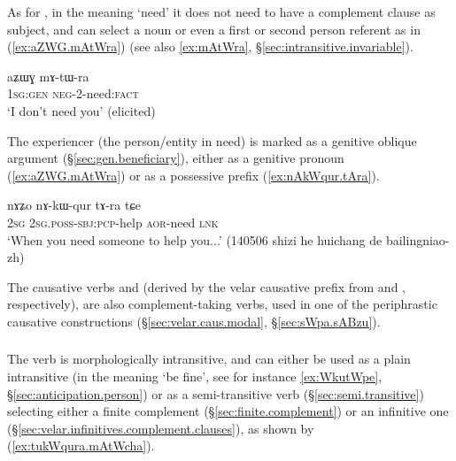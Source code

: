 As for , in the meaning `need' it does not need to have a complement clause as subject, and can select a noun or even a first or second person referent as in (\ref{ex:aZWG.mAtWra}) (see also \ref{ex:mAtWra}, §\ref{sec:intransitive.invariable}).  

\begin{exe} 
\ex \label{ex:aZWG.mAtWra}
\gll  aʑɯɣ mɤ-tɯ-ra \\
 \textsc{1sg}:\textsc{gen} \textsc{neg}-2-need:\textsc{fact} \\
 \glt `I don't need you' (elicited)
\end{exe} 

The experiencer (the person/entity in need) is marked as a genitive oblique argument (§\ref{sec:gen.beneficiary}), either as a genitive pronoun (\ref{ex:aZWG.mAtWra}) or as a possessive prefix (\ref{ex:nAkWqur.tAra}).
 
\begin{exe} 
\ex \label{ex:nAkWqur.tAra}
\gll nɤʑo nɤ-kɯ-qur tɤ-ra tɕe \\
\textsc{2sg} \textsc{2sg}.\textsc{poss}-\textsc{sbj}:\textsc{pcp}-help \textsc{aor}-need \textsc{lnk} \\
\glt `When you need someone to help you...' (140506 shizi he huichang de bailingniao-zh)
\end{exe}  


The causative verbs  and   (derived by the velar causative prefix from  and , respectively), are also com\-ple\-ment-taking verbs, used in one of the periphrastic causative constructions (§\ref{sec:velar.caus.modal}, §\ref{sec:sWpa.sABzu}).

 \subsubsection{} \label{sec:cha.verb}
The verb  is morphologically intransitive, and can either be used as a plain intransitive (in the meaning `be fine', see for instance \ref{ex:WkutWpe}, §\ref{sec:anticipation.person}) or as a semi-transitive verb (§\ref{sec:semi.transitive}) selecting either a finite complement (§\ref{sec:finite.complement}) or an infinitive one (§\ref{sec:velar.infinitives.complement.clauses}), as shown by (\ref{ex:tukWqura.mAtWcha}).

